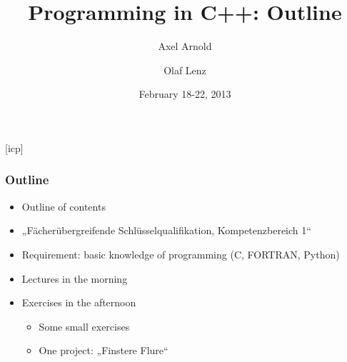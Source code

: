 \documentclass{slides}
\begin{document}
\graphicspath{{figures/}}

\title[Programming in C++: Outline]{\Large Programming in C++: Outline}

\author[A. Arnold and O. Lenz]{Axel Arnold \and Olaf Lenz} 
\date{February 18-22, 2013}

\begin{frame}
  \titlepage
\end {frame}
[icp]

\begin{frame}
  \frametitle{Outline}
  \begin{itemize}
  \item Outline of contents
  \item „Fächerübergreifende Schlüsselqualifikation, Kompetenzbereich 1“
  \item Requirement: basic knowledge of programming (C, FORTRAN, Python)
  \item Lectures in the morning
  \item Exercises in the afternoon
    \begin{itemize}
    \item Some small exercises
    \item One project: „Finstere Flure“
    \end{itemize}
  \end{itemize}
\end{frame}
\end{document}
